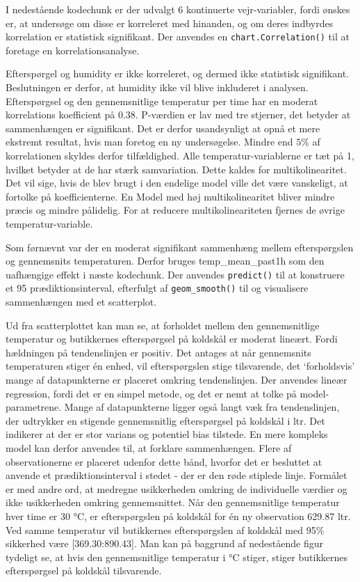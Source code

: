 \documentclass[
  12pt,
  a4paper,
  DIV=11,
  numbers=noendperiod]{scrartcl}
\begin{document}
I nedestående kodechunk er der udvalgt 6 kontinuerte vejr-variabler,
fordi ønskes er, at undersøge om disse er korreleret med hinanden, og om
deres indbyrdes korrelation er statistisk signifikant. Der anvendes en
\texttt{chart.Correlation()} til at foretage en korrelationsanalyse.

Efterspørgel og humidity er ikke korreleret, og dermed ikke statistisk
signifikant. Beslutningen er derfor, at humidity ikke vil blive
inkluderet i analysen. Efterspørgsel og den gennemsnitlige temperatur
per time har en moderat korrelations koefficient på 0.38. P-værdien er
lav med tre stjerner, det betyder at sammenhængen er signifikant. Det er
derfor usandsynligt at opnå et mere ekstremt resultat, hvis man foretog
en ny undersøgelse. Mindre end \(5\%\) af korrelationen skyldes derfor
tilfældighed. Alle temperatur-variablerne er tæt på 1, hvilket betyder
at de har stærk samvariation. Dette kaldes for multikolinearitet. Det
vil sige, hvis de blev brugt i den endelige model ville det være
vanskeligt, at fortolke på koefficienterne. En Model med høj
multikolinearitet bliver mindre præcis og mindre pålidelig. For at
reducere multikolineariteten fjernes de øvrige temperatur-variable.

Som førnævnt var der en moderat signifikant sammenhæng mellem
efterspørgslen og gennemsnits temperaturen. Derfor bruges
temp\_mean\_past1h som den uafhængige effekt i næste kodechunk. Der
anvendes \texttt{predict()} til at konstruere et 95\(%
\) prædiktionsinterval, efterfulgt af \texttt{geom\_smooth()} til og
visualisere sammenhængen med et scatterplot.

Ud fra scatterplottet kan man se, at forholdet mellem den gennemsnitlige
temperatur og butikkernes efterspørgsel på koldskål er moderat lineært.
Fordi hældningen på tendenslinjen er positiv. Det antages at når
gennemsnits temperaturen stiger én enhed, vil efterspørgslen stige
tilsvarende, det `forholdsvis' mange af datapunkterne er placeret
omkring tendenslinjen. Der anvendes lineær regression, fordi det er en
simpel metode, og det er nemt at tolke på model-parametrene. Mange af
datapunkterne ligger også langt væk fra tendenslinjen, der udtrykker en
stigende gennemsnitlig efterspørgsel på koldskål i ltr. Det indikerer at
der er stor varians og potentiel bias tilstede. En mere kompleks model
kan derfor anvendes til, at forklare sammenhængen. Flere af
observationerne er placeret udenfor dette bånd, hvorfor det er besluttet
at anvende et prædiktionsinterval i stedet - der er den røde stiplede
linje. Formålet er med andre ord, at medregne usikkerheden omkring de
individuelle værdier og ikke usikkerheden omkring gennemsnittet. Når den
gennemsnitlige temperatur hver time er 30 °C, er efterspørgslen på
koldskål for én ny observation 629.87 ltr. Ved samme temperatur vil
butikkernes efterspørgslen af koldskål med 95\% sikkerhed være
{[}369.30:890.43{]}. Man kan på baggrund af nedestående figur tydeligt
se, at hvis den gennemsnitlige temperatur i °C stiger, stiger
butikkernes efterspørgsel på koldskål tilsvarende.
\end{document}
